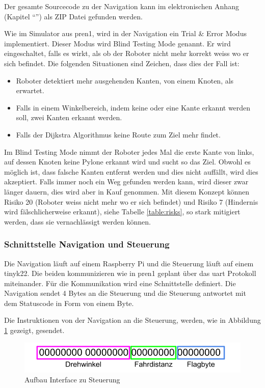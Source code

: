 Der gesamte Sourcecode zu der Navigation kann im elektronischen Anhang (Kapitel ``'') als ZIP Datei gefunden werden.

Wie im Simulator aus \acrshort{pren1}, wird in der Navigation ein Trial \& Error Modus implementiert. Dieser Modus wird Blind Testing Mode genannt. Er wird eingeschaltet, falls es wirkt, als ob der Roboter nicht mehr korrekt weiss wo er sich befindet. Die folgenden Situationen sind Zeichen, dass dies der Fall ist:

\begin{itemize}
    \item Roboter detektiert mehr ausgehenden Kanten, von einem Knoten, als erwartet.
    \item Falls in einem Winkelbereich, indem keine oder eine Kante erkannt werden soll, zwei Kanten erkannt werden.
    \item Falls der Dijkstra Algorithmus keine Route zum Ziel mehr findet.
\end{itemize}

Im Blind Testing Mode nimmt der Roboter jedes Mal die erste Kante von links, auf dessen Knoten keine Pylone erkannt wird und sucht so das Ziel. Obwohl es möglich ist, dass falsche Kanten entfernt werden und dies nicht auffällt, wird dies akzeptiert. Falls immer noch ein Weg gefunden werden kann, wird dieser zwar länger dauern, dies wird aber in Kauf genommen. Mit diesem Konzept können Risiko 20 (Roboter weiss nicht mehr wo er sich befindet) und Risiko 7 (Hindernis wird fälschlicherweise erkannt), siehe Tabelle \ref{table:risks}, so stark mitigiert werden, dass sie vernachlässigt werden können.

\subsubsection{Schnittstelle Navigation und Steuerung}
\label{interface-nav-control}

Die Navigation läuft auf einem Raspberry Pi und die Steuerung läuft auf einem \gls{tinyk22}. Die beiden kommunizieren wie in \acrshort{pren1} geplant über das \acrfull{uart} Protokoll miteinander. Für die Kommunikation wird eine Schnittstelle definiert. Die Navigation sendet 4 Bytes an die Steuerung und die Steuerung antwortet mit dem Statuscode in Form von einem Byte.

Die Instruktionen von der Navigation an die Steuerung, werden, wie in Abbildung \ref{fig:interface-tiny} gezeigt, gesendet.

\begin{figure}[H]
\centering
\includegraphics[width=\textwidth]{assets/IT/interface-tiny.png}
\caption{Aufbau Interface zu Steuerung}
\label{fig:interface-tiny}
\end{figure}

